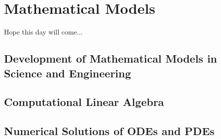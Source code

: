 \chapter{Mathematical Models}
Hope this day will come...
\section{Development of Mathematical Models in Science and Engineering}
\section{Computational Linear Algebra}
\section{Numerical Solutions of ODEs and PDEs}
